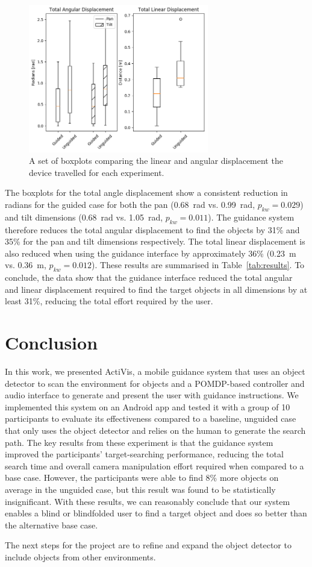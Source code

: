\documentclass[runningheads]{llncs}
\begin{document}
\begin{figure}
  \centering
  \includegraphics[width=0.7\textwidth]{figures/boxplot_displacement.png}
  \caption{A set of boxplots comparing the linear and angular displacement the device travelled for each experiment. }\label{fig:boxplot-displacement}
\end{figure}

The boxplots for the total angle displacement show a consistent reduction in radians for the guided case for both the pan (\SI{0.68}{\radian} vs. \SI{0.99}{\radian}, $p_{kw}=0.029$) and tilt dimensions (\SI{0.68}{\radian} vs. \SI{1.05}{\radian}, $p_{kw}=0.011$). 
The guidance system therefore reduces the total angular displacement to find the objects by 31\% and 35\% for the pan and tilt dimensions respectively. 
The total linear displacement is also reduced when using the guidance interface by approximately 36\% (\SI{0.23}{\metre} vs. \SI{0.36}{\metre}, $p_{kw}=0.012$).
These results are summarised in Table~\ref{tab:results}.
To conclude, the data show that the guidance interface reduced the total angular and linear displacement required to find the target objects in all dimensions by at least 31\%, reducing the total effort required by the user. 

\section{Conclusion}\label{sec:conclusion}

In this work, we presented ActiVis, a mobile guidance system that uses an object detector to scan the environment for objects and a POMDP-based controller and audio interface to generate and present the user with guidance instructions. 
We implemented this system on an Android app and tested it with a group of 10 participants to evaluate its effectiveness compared to a baseline, unguided case that only uses the object detector and relies on the human to generate the search path. 
The key results from these experiment is that the guidance system improved the participants' target-searching performance, reducing the total search time and overall camera manipulation effort required when compared to a base case.
However, the participants were able to find 8\% more objects on average in the unguided case, but this result was found to be statistically insignificant. 
With these results, we can reasonably conclude that our system enables a blind or blindfolded user to find a target object and does so better than the alternative base case.

The next steps for the project are to refine and expand the object detector to include objects from other environments. 



\end{document}
